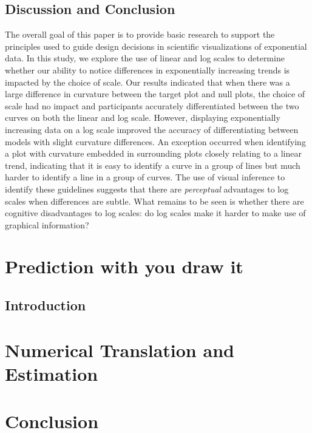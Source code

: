 \documentclass[print]{nuthesis}
\begin{document}
\hypertarget{discussion-and-conclusion}{%
\section{Discussion and Conclusion}\label{discussion-and-conclusion}}

The overall goal of this paper is to provide basic research to support the principles used to guide design decisions in scientific visualizations of exponential data.
In this study, we explore the use of linear and log scales to determine whether our ability to notice differences in exponentially increasing trends is impacted by the choice of scale.
Our results indicated that when there was a large difference in curvature between the target plot and null plots, the choice of scale had no impact and participants accurately differentiated between the two curves on both the linear and log scale.
However, displaying exponentially increasing data on a log scale improved the accuracy of differentiating between models with slight curvature differences.
An exception occurred when identifying a plot with curvature embedded in surrounding plots closely relating to a linear trend, indicating that it is easy to identify a curve in a group of lines but much harder to identify a line in a group of curves.
The use of visual inference to identify these guidelines suggests that there are \emph{perceptual} advantages to log scales when differences are subtle.
What remains to be seen is whether there are cognitive disadvantages to log scales: do log scales make it harder to make use of graphical information?

\hypertarget{youdrawit}{%
\chapter{Prediction with you draw it}\label{youdrawit}}

\hypertarget{introduction-1}{%
\section{Introduction}\label{introduction-1}}

\hypertarget{estimation}{%
\chapter{Numerical Translation and Estimation}\label{estimation}}

\hypertarget{conclusion}{%
\chapter{Conclusion}\label{conclusion}}
\end{document}
